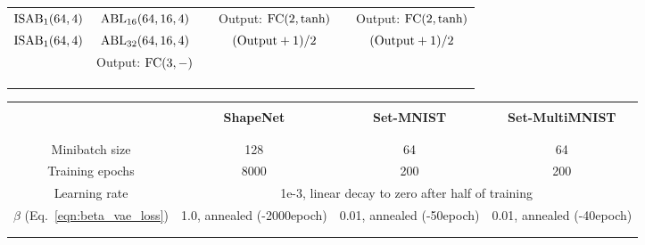 \documentclass[final]{arxiv/cvpr}
\begin{document}
\begin{figure*}[!t]
\begin{minipage}{\linewidth}
\begin{adjustbox}{width=0.95\textwidth}
\begin{tabular}{cc|cc|cc}
        $\textnormal{ISAB}_{1}(64, 4)$ & $\textnormal{ABL}_{16}(64, 16, 4)$ & & Output: $\textnormal{FC}(2, \textnormal{tanh})$ & & Output: $\textnormal{FC}(2, \textnormal{tanh})$ \\
        $\textnormal{ISAB}_{1}(64, 4)$ & $\textnormal{ABL}_{32}(64, 16, 4)$ & & $(\textnormal{Output}+1)/2$ & & $(\textnormal{Output}+1)/2$ \\
        & Output: $\textnormal{FC}(3, -)$ & & & & \\
        & & & & & \\
        \\[-1em]\Xhline{2\arrayrulewidth}
        \end{tabular}
    \end{adjustbox}
    \vspace{1cm}
\vspace{0.1cm}
    \begin{adjustbox}{width=0.95\textwidth}
        \label{table:hyperparameters}
        \footnotesize
        \begin{tabular}{cccc}
        \Xhline{2\arrayrulewidth}
        \\[-1em] & \textbf{ShapeNet} & \textbf{Set-MNIST} & \textbf{Set-MultiMNIST}\\
        \\[-1em] \Xhline{2\arrayrulewidth}
        \\[-1em]
        Minibatch size & 128 & 64 & 64 \\
        Training epochs & 8000 & 200 & 200 \\
        Learning rate & \multicolumn{3}{c}{1e-3, linear decay to zero after half of training} \\
        $\beta$ (Eq.~\eqref{eqn:beta_vae_loss}) & 1.0, annealed (-2000epoch) & 0.01, annealed (-50epoch) & 0.01, annealed (-40epoch) \\
        \\[-1em]\Xhline{2\arrayrulewidth}
        \end{tabular}
    \end{adjustbox}
\end{minipage}
\end{figure*}
 
\end{document}
